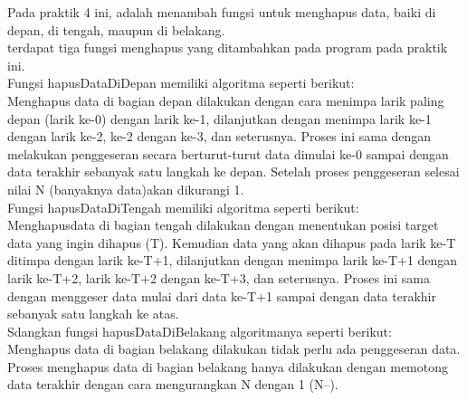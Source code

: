 \documentclass[a4paper,12pt]{article}
\begin{document}
Pada praktik 4 ini, adalah menambah fungsi untuk menghapus data, baiki di depan, di tengah, maupun di belakang.\\
terdapat tiga fungsi menghapus yang ditambahkan pada program pada praktik ini.\\
Fungsi hapusDataDiDepan memiliki algoritma seperti berikut:\\
Menghapus data di bagian depan dilakukan dengan cara menimpa larik paling depan (larik ke-0) dengan larik ke-1,
dilanjutkan dengan menimpa larik ke-1 dengan larik ke-2, ke-2 dengan ke-3, dan seterusnya. Proses ini sama dengan
melakukan penggeseran secara berturut-turut data dimulai ke-0 sampai dengan data terakhir sebanyak satu langkah ke
depan. Setelah proses penggeseran selesai nilai N (banyaknya data)akan dikurangi 1.\\
Fungsi hapusDataDiTengah memiliki algoritma seperti berikut:\\
Menghapusdata di bagian tengah dilakukan dengan menentukan posisi target data yang ingin dihapus (T). Kemudian data yang
akan dihapus pada larik ke-T ditimpa dengan larik ke-T+1, dilanjutkan dengan menimpa larik ke-T+1 dengan larik ke-T+2,
larik ke-T+2 dengan ke-T+3, dan seterusnya. Proses ini sama dengan menggeser data mulai dari data ke-T+1 sampai dengan
data terakhir sebanyak satu langkah ke atas.\\
Sdangkan fungsi hapusDataDiBelakang algoritmanya seperti berikut:\\
Menghapus data di bagian belakang dilakukan tidak perlu ada penggeseran data. Proses menghapus data di bagian belakang
hanya dilakukan dengan memotong data terakhir dengan cara mengurangkan N dengan 1 (N--).

\newpage
\end{document}
